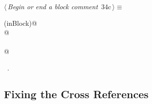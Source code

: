 \documentclass[a4paper]{report}
\begin{document}
\begin{flushleft} \small
\begin{minipage}{\linewidth}\label{scrap63}\raggedright\small
{} $\langle\,${\it Begin or end a block comment}\nobreak\ {\footnotesize {34c}}$\,\rangle\equiv$
\vspace{-1ex}
\begin{list}{}{} \item
\mbox{}\verb@if (inBlock)@\\
\mbox{}@\\
\mbox{}\verb@else@\\
\mbox{}@{\NWsep}
\end{list}
\vspace{-1.5ex}
\footnotesize
\begin{list}{}{\setlength{\itemsep}{-\parsep}\setlength{\itemindent}{-\leftmargin}}
\item \NWtxtMacroRefIn\ .

\item{}
\end{list}
\end{minipage}\vspace{4ex}
\end{flushleft}
\subsection{Fixing the Cross References}
\end{document}
